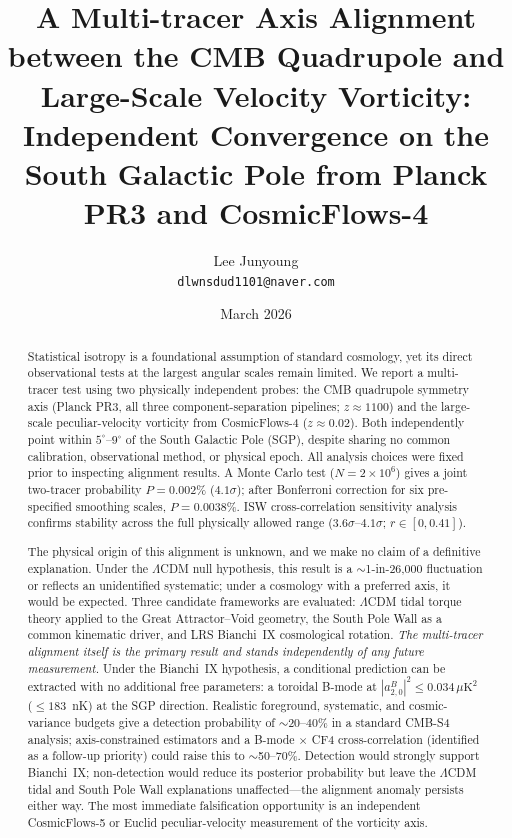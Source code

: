\documentclass[12pt]{article}
\title{A Multi-tracer Axis Alignment between the CMB Quadrupole
and Large-Scale Velocity Vorticity:\\
Independent Convergence on the South Galactic Pole
from Planck PR3 and CosmicFlows-4}
\author{Lee Junyoung\\
\texttt{dlwnsdud1101@naver.com}}
\date{March 2026}
\begin{document}
\maketitle

\begin{abstract}
Statistical isotropy is a foundational assumption of standard cosmology, yet
its direct observational tests at the largest angular scales remain limited.
We report a multi-tracer test using two physically independent probes:
the CMB quadrupole symmetry axis (Planck PR3, all three component-separation
pipelines; $z\approx1100$) and the large-scale peculiar-velocity vorticity
from CosmicFlows-4 ($z\approx0.02$).
Both independently point within $5^\circ$--$9^\circ$ of the South Galactic Pole
(SGP), despite sharing no common calibration, observational method, or physical
epoch.
All analysis choices were fixed prior to inspecting alignment results.
A Monte Carlo test ($N=2\times10^6$) gives a joint two-tracer probability
$P=0.002\%$ ($4.1\sigma$); after Bonferroni correction for six pre-specified
smoothing scales, $P=0.0038\%$.
ISW cross-correlation sensitivity analysis confirms stability across the full
physically allowed range ($3.6\sigma$--$4.1\sigma$; $r\in[0,0.41]$).

The physical origin of this alignment is unknown, and we make no claim of a
definitive explanation.
Under the $\Lambda$CDM null hypothesis, this result is a $\sim$1-in-26{,}000
fluctuation or reflects an unidentified systematic; under a cosmology with a
preferred axis, it would be expected.
Three candidate frameworks are evaluated: $\Lambda$CDM tidal torque theory
applied to the Great Attractor--Void geometry, the South Pole Wall as a common
kinematic driver, and LRS Bianchi~IX cosmological rotation.
\emph{The multi-tracer alignment itself is the primary result and stands
independently of any future measurement.}
Under the Bianchi~IX hypothesis, a conditional prediction can be extracted
with no additional free parameters:
a toroidal B-mode at $|a^B_{2,0}|^2\leq0.034\,\mu\mathrm{K}^2$ ($\leq183$~nK)
at the SGP direction.
Realistic foreground, systematic, and cosmic-variance budgets give a detection
probability of $\sim$20--40\% in a standard CMB-S4 analysis;
axis-constrained estimators and a B-mode $\times$ CF4 cross-correlation
(identified as a follow-up priority) could raise this to $\sim$50--70\%.
Detection would strongly support Bianchi~IX; non-detection would reduce its
posterior probability but leave the $\Lambda$CDM tidal and South Pole Wall
explanations unaffected---the alignment anomaly persists either way.
The most immediate falsification opportunity is an independent
CosmicFlows-5 or Euclid peculiar-velocity measurement of the vorticity axis.
\end{abstract}
\end{document}
